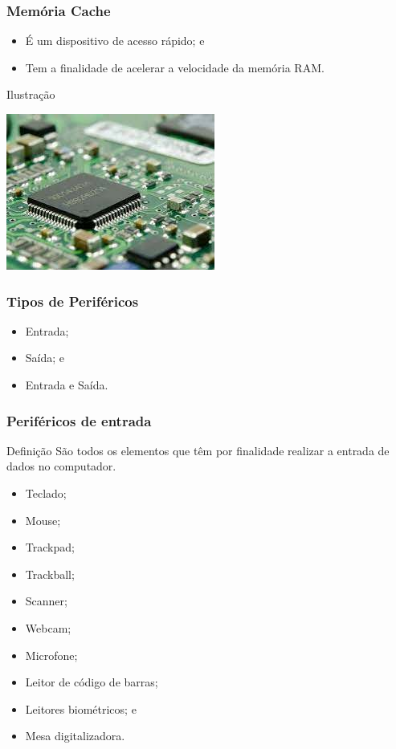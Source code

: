\documentclass[aspectratio=169]{beamer} %
\begin{document}
\begin{frame}
	\frametitle{Memória Cache}
		
	\begin{itemize}
		\item É um dispositivo de acesso rápido; e
		\item Tem a finalidade de acelerar a velocidade da memória RAM.
	\end{itemize}\vfill
	
	\begin{exampleblock}{Ilustra\c cão}
		\begin{center}
			\includegraphics[scale=0.4]{img/cache}
		\end{center}		
	\end{exampleblock}
\end{frame}

\begin{frame}
	\frametitle{Tipos de Periféricos}
		
	\begin{itemize}
		\item Entrada;
		\item Saída; e
		\item Entrada e Saída.
	\end{itemize}
\end{frame}

\begin{frame}
	\frametitle{Periféricos de entrada}
	
	\begin{block}{Defini\c cão}
		São todos os elementos que têm por finalidade realizar a entrada de dados no computador.
	\end{block}\vfill
	
	\begin{itemize}
		\item Teclado;
		\item Mouse;
		\item Trackpad;
		\item Trackball;
		\item Scanner;
		\item Webcam;
		\item Microfone;
		\item Leitor de código de barras;
		\item Leitores biométricos; e
		\item Mesa digitalizadora.
	\end{itemize}
\end{frame}
\end{document}
